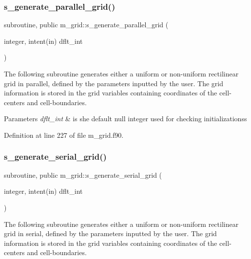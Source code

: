 \subsubsection{\texorpdfstring{s\+\_\+generate\+\_\+parallel\+\_\+grid()}{s\_generate\_parallel\_grid()}}
{\footnotesize\ttfamily subroutine, public m\+\_\+grid\+::s\+\_\+generate\+\_\+parallel\+\_\+grid (\begin{DoxyParamCaption}\item[{integer, intent(in)}]{dflt\+\_\+int }\end{DoxyParamCaption})}



The following subroutine generates either a uniform or non-\/uniform rectilinear grid in parallel, defined by the parameters inputted by the user. The grid information is stored in the grid variables containing coordinates of the cell-\/ centers and cell-\/boundaries. 


\begin{DoxyParams}{Parameters}
{\em dflt\+\_\+int} & is she default null integer used for checking initializationss \\
\hline
\end{DoxyParams}


Definition at line 227 of file m\+\_\+grid.\+f90.

\mbox{\label{namespacem__grid_a7c0d1c6fcecd2759774be2b3786a6b50}} 
\subsubsection{\texorpdfstring{s\+\_\+generate\+\_\+serial\+\_\+grid()}{s\_generate\_serial\_grid()}}
{\footnotesize\ttfamily subroutine, public m\+\_\+grid\+::s\+\_\+generate\+\_\+serial\+\_\+grid (\begin{DoxyParamCaption}\item[{integer, intent(in)}]{dflt\+\_\+int }\end{DoxyParamCaption})}



The following subroutine generates either a uniform or non-\/uniform rectilinear grid in serial, defined by the parameters inputted by the user. The grid information is stored in the grid variables containing coordinates of the cell-\/ centers and cell-\/boundaries. 


